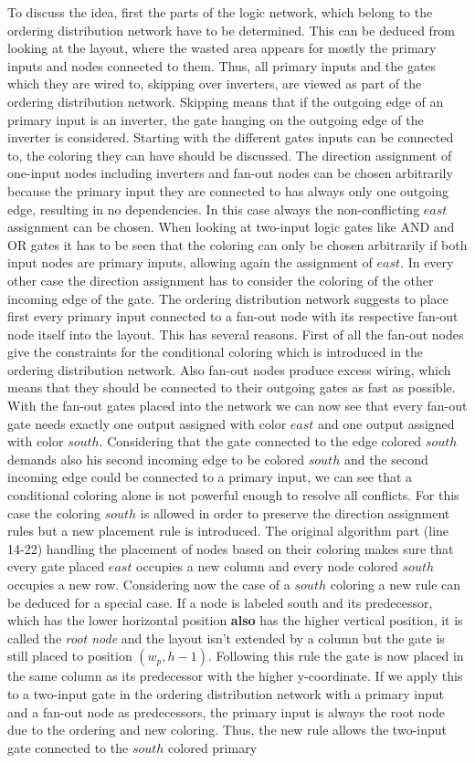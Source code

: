 To discuss the idea, first the parts of the logic network, which belong to the ordering distribution network have to be determined. This can be deduced from looking at the layout, where the wasted area appears for mostly the primary inputs and nodes connected to them. Thus, all primary inputs and the gates which they are wired to, skipping over inverters, are viewed as part of the ordering distribution network. Skipping means that if the outgoing edge of an primary input is an inverter, the gate hanging on the outgoing edge of the inverter is considered. Starting with the different gates inputs can be connected to, the coloring they can have should be discussed. The direction assignment of one-input nodes including inverters and fan-out nodes can be chosen arbitrarily because the primary input they are connected to has always only one outgoing edge, resulting in no dependencies. In this case always the non-conflicting $east$ assignment can be chosen. When looking at two-input logic gates like AND and OR gates it has to be seen that the coloring can only be chosen arbitrarily if both input nodes are primary inputs, allowing again the assignment of $east$. In every other case the direction assignment has to consider the coloring of the other incoming edge of the gate. The ordering distribution network suggests to place first every primary input connected to a fan-out node with its respective fan-out node itself into the layout. This has several reasons. First of all the fan-out nodes give the constraints for the conditional coloring which is introduced in the ordering distribution network. Also fan-out nodes produce excess wiring, which means that they should be connected to their outgoing gates as fast as possible. With the fan-out gates placed into the network we can now see that every fan-out gate needs exactly one output assigned with color $east$ and one output assigned with color $south$. Considering that the gate connected to the edge colored $south$ demands also his second incoming edge to be colored $south$ and the second incoming edge could be connected to a primary input, we can see that a conditional coloring alone is not powerful enough to resolve all conflicts. For this case the coloring $south$ is allowed in order to preserve the direction assignment rules but a new placement rule is introduced. The original algorithm part (line 14-22) handling the placement of nodes based on their coloring makes sure that every gate placed $east$ occupies a new column and every node colored $south$ occupies a new row. Considering now the case of a $south$ coloring a new rule can be deduced for a special case. If a node is labeled south and its predecessor, which has the lower horizontal position \textbf{also} has the higher vertical position, it is called the \textit{root node} and the layout isn't extended by a column but the gate is still placed to position $(w_p, h-1)$. Following this rule the gate is now placed in the same column as its predecessor with the higher y-coordinate. If we apply this to a two-input gate in the ordering distribution network with a primary input and a fan-out node as predecessors, the primary input is always the root node due to the ordering and new coloring. Thus, the new rule allows the two-input gate connected to the $south$ colored primary 